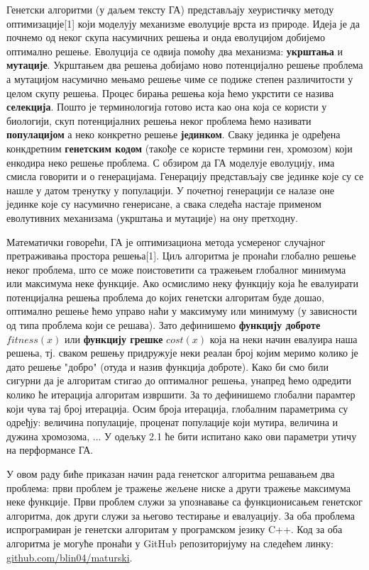 \documentclass{article}
\begin{document}
Генетски алгоритми (у даљем тексту ГА) представљају хеуристичку методу оптимизације[1] који моделују
механизме еволуције врста из природе. Идеја је да почнемо од неког скупа насумичних решења и онда
еволуцијом добијемо оптимално решење. Еволуција се одвија помоћу два механизма: \textbf{укрштања}
и \textbf{мутације}. Укрштањем два решења добијамо ново потенцијално решење проблема а мутацијом насумично мењамо решење чиме
се подиже степен различитости у целом скупу решења. Процес бирања решења која ћемо укрстити се назива 
\textbf{селекција}. Пошто је терминологија готово иста као она која се користи у биологији, скуп потенцијалних 
решења неког проблема ћемо називати \textbf{популацијом} а неко конкретно решење \textbf{јединком}. 
Сваку јединка је одређена конкдретним \textbf{генетским кодом} (такође се користе термини ген, хромозом) који енкодира неко
решење проблема. С обзиром да  ГА моделује еволуцију, има смисла говорити и о генерацијама. Генерацију 
представљају све јединке које су се нашле у датом тренутку у популацији. У почетној генерацији се 
налазе оне јединке које су насумично генерисане, а свака следећа настаје применом еволутивних 
механизама (укрштања и мутације) на ону претходну. 

Математички говорећи, ГА је оптимизациона метода усмереног случајног претраживања
простора решења[1]. Циљ алгоритма је пронаћи глобално решење неког проблема, што се 
може поистоветити са тражењем глобалног минимума или максимума неке функције. Ако
осмислимо неку функцију која ће евалуирати потенцијална решења проблема до којих 
генетски алгоритам буде дошао, оптимално решење ћемо управо наћи у максимуму или
минимуму (у зависности од типа проблема који се решава). Зато дефинишемо \textbf{функцију доброте}
$fitness(x)$ или \textbf{функцију грешке} $cost(x)$ која на неки начин евалуира наша решења, 
тј. сваком решењу придружује неки реалан број којим меримо колико је дато решење "добро"
(отуда и назив функција доброте). Како би смо били сигурни да је алгоритам стигао до
оптималног решења, унапред ћемо одредити колико ће итерација алгоритам извршити. За то
дефинишемо глобални парамтер који чува тај број итерација. Осим броја итерација, глобалним 
параметрима су одређју: величина популације, проценат популације који мутира, величина и дужина хромозома,
... У одељку 2.1 ће бити испитано како ови параметри утичу на перформансе ГА.

У овом раду биће приказан начин рада генетског алгоритма решавањем два проблема: први проблем
је тражење жељене ниске а други тражење максимума неке функције. Први проблем служи за 
упознавање са функционисањем генетског алгоритма, док други служи за његово тестирање и 
евалуацију. За оба проблема испрограмиран је генетски алгоритам у програмском језику 
C++. Код за оба алгоритма је могуће пронаћи у GitHub репозиторијуму на следећем
линку: \url{github.com/blin04/maturski}.
\end{document}
